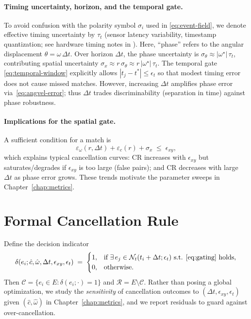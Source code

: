 \paragraph{Timing uncertainty, horizon, and the temporal gate.}
To avoid confusion with the polarity symbol $\sigma_i$ used in \eqref{eq:event-field}, we denote effective timing uncertainty by $\tau_t$ (sensor latency variability, timestamp quantization; see hardware timing notes in \cite{Lichtsteiner2008,Delbruck2014ISCAS}). Here, ``phase'' refers to the angular displacement $\theta=\omega\,\Delta t$. Over horizon $\Delta t$, the phase uncertainty is $\sigma_\theta \approx |\omega^\star|\,\tau_t$, contributing spatial uncertainty $\sigma_x \approx r\,\sigma_\theta \approx r\,|\omega^\star|\,\tau_t$. The temporal gate \eqref{eq:temporal-window} explicitly allows $|t_j-t^*|\le \epsilon_t$ so that modest timing error does not cause missed matches. However, increasing $\Delta t$ amplifies phase error via~\eqref{eq:angvel-error}; thus $\Delta t$ trades discriminability (separation in time) against phase robustness.

\paragraph{Implications for the spatial gate.}
A sufficient condition for a match is
\begin{equation}
\varepsilon_{\omega}(r,\Delta t) + \varepsilon_c(r) + \sigma_x \;\le\; \epsilon_{xy},
\label{eq:gate-condition}
\end{equation}
which explains typical cancellation curves: $\mathrm{CR}$ increases with $\epsilon_{xy}$ but saturates/degrades if $\epsilon_{xy}$ is too large (false pairs); and $\mathrm{CR}$ decreases with large $\Delta t$ as phase error grows. These trends motivate the parameter sweeps in Chapter~\ref{chap:metrics}.

\section{Formal Cancellation Rule}
Define the decision indicator
\begin{equation}
\delta(e_i; \hat c,\hat\omega,\Delta t,\epsilon_{xy},\epsilon_t) \;=\;
\begin{cases}
1, & \text{if } \exists\, e_j \in \mathcal{N}_t(t_i+\Delta t;\epsilon_t) \text{ s.t. } \eqref{eq:gating}\text{ holds},\\
0, & \text{otherwise.}
\end{cases}
\label{eq:delta-indicator}
\end{equation}
Then $\mathcal{C}=\{e_i\in E:\delta(e_i;\cdot)=1\}$ and $\mathcal{R}=E\setminus \mathcal{C}$. Rather than posing a global optimization, we study the \emph{sensitivity} of cancellation outcomes to $(\Delta t,\epsilon_{xy},\epsilon_t)$ given $(\hat c,\hat\omega)$ in Chapter~\ref{chap:metrics}, and we report residuals to guard against over-cancellation.

